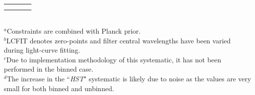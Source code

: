 \begin{table}
\begin{tabular}{lccc}
\toprule\\
\label{Tab:binnedinputsys}
\vspace{-4mm}
\end{tabular}
{\raggedright
\\
$^a$Constraints are combined with Planck prior.\\
$^b$LCFIT denotes zero-points and filter central wavelengths have been varied during light-curve fitting.\\
$^c$Due to implementation methodology of this systematic, it has not been performed in the binned case.\\
$^d$The increase in the ``{\it HST}" systematic is likely due to noise as the values are very small for both binned and unbinned.\\
\vspace{26mm}
}
\end{table}






















